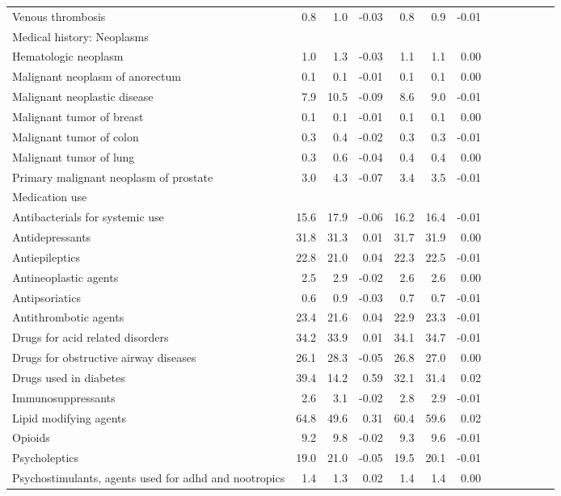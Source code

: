 \documentclass[11pt,]{article}
\begin{document}
\begin{longtable}{lrrrrrrrrrrrr}
      Venous thrombosis &  0.8 &  1.0 & -0.03 &  0.8 &  0.9 & -0.01 \\ 
  Medical history: Neoplasms &    &    &     &    &    &     \\ 
      Hematologic neoplasm &  1.0 &  1.3 & -0.03 &  1.1 &  1.1 &  0.00 \\ 
      Malignant neoplasm of anorectum &  0.1 &  0.1 & -0.01 &  0.1 &  0.1 &  0.00 \\ 
      Malignant neoplastic disease &  7.9 & 10.5 & -0.09 &  8.6 &  9.0 & -0.01 \\ 
      Malignant tumor of breast &  0.1 &  0.1 & -0.01 &  0.1 &  0.1 &  0.00 \\ 
      Malignant tumor of colon &  0.3 &  0.4 & -0.02 &  0.3 &  0.3 & -0.01 \\ 
      Malignant tumor of lung &  0.3 &  0.6 & -0.04 &  0.4 &  0.4 &  0.00 \\ 
      Primary malignant neoplasm of prostate &  3.0 &  4.3 & -0.07 &  3.4 &  3.5 & -0.01 \\ 
  Medication use &    &    &     &    &    &     \\ 
      Antibacterials for systemic use & 15.6 & 17.9 & -0.06 & 16.2 & 16.4 & -0.01 \\ 
      Antidepressants & 31.8 & 31.3 &  0.01 & 31.7 & 31.9 &  0.00 \\ 
      Antiepileptics & 22.8 & 21.0 &  0.04 & 22.3 & 22.5 & -0.01 \\ 
      Antineoplastic agents &  2.5 &  2.9 & -0.02 &  2.6 &  2.6 &  0.00 \\ 
      Antipsoriatics &  0.6 &  0.9 & -0.03 &  0.7 &  0.7 & -0.01 \\ 
      Antithrombotic agents & 23.4 & 21.6 &  0.04 & 22.9 & 23.3 & -0.01 \\ 
      Drugs for acid related disorders & 34.2 & 33.9 &  0.01 & 34.1 & 34.7 & -0.01 \\ 
      Drugs for obstructive airway diseases & 26.1 & 28.3 & -0.05 & 26.8 & 27.0 &  0.00 \\ 
      Drugs used in diabetes & 39.4 & 14.2 &  0.59 & 32.1 & 31.4 &  0.02 \\ 
      Immunosuppressants &  2.6 &  3.1 & -0.02 &  2.8 &  2.9 & -0.01 \\ 
      Lipid modifying agents & 64.8 & 49.6 &  0.31 & 60.4 & 59.6 &  0.02 \\ 
      Opioids &  9.2 &  9.8 & -0.02 &  9.3 &  9.6 & -0.01 \\ 
      Psycholeptics & 19.0 & 21.0 & -0.05 & 19.5 & 20.1 & -0.01 \\ 
      Psychostimulants, agents used for adhd and nootropics &  1.4 &  1.3 &  0.02 &  1.4 &  1.4 &  0.00 \\ 
   \bottomrule\end{longtable}
\end{document}

